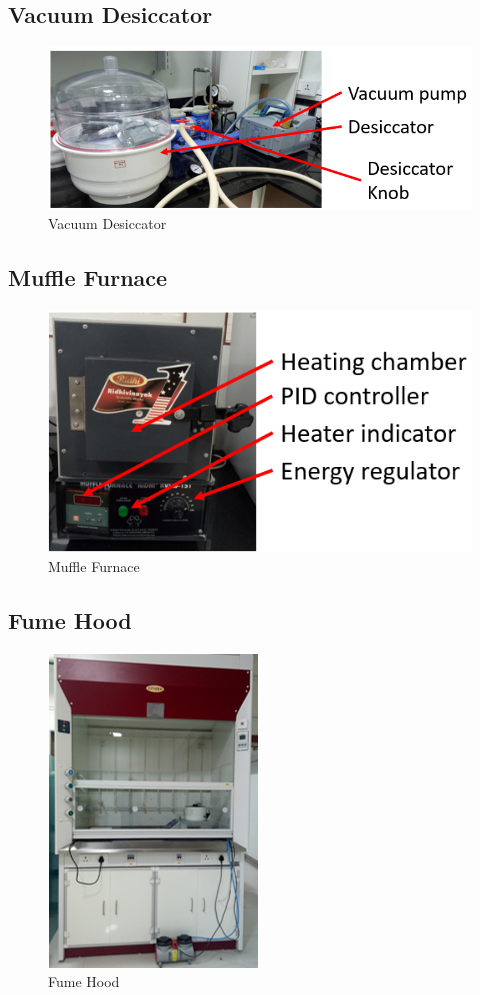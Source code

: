 \subsection{Vacuum Desiccator}
\begin{figure}[H]
	\centering
		
		\includegraphics{11.png}
		\caption{Vacuum Desiccator}
\end{figure}
\subsection{Muffle Furnace}
\begin{figure}[H]
	\centering
		
		\includegraphics{12.png}
		\caption{Muffle Furnace}
\end{figure}
\subsection{Fume Hood}
\begin{figure}[H]
	\centering
		
		\includegraphics{13.png}
		\caption{Fume Hood}
\end{figure}
